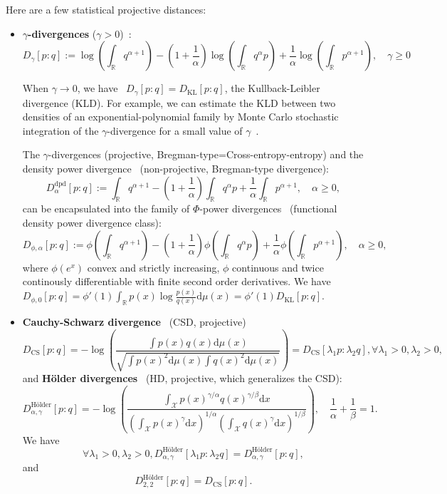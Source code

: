 \documentclass[11pt]{article}
\def\dmu{\mathrm{d}\mu}
\def\KL{\mathrm{KL}}
\def\CS{\mathrm{CS}}
\def\dmu{\mathrm{d}\mu}
\def\KL{\mathrm{KL}}
\begin{document}
Here are a few statistical projective distances:

\begin{itemize}
\item {\bf $\gamma$-divergences} ($\gamma>0$)~\cite{gammadivergence-2001,gammadivergence-2008}:
$$
D_{\gamma}[p:q]:=\log \left(\int_{\mathbb{R}} q^{\alpha+1}\right)-\left(1+\frac{1}{\alpha}\right) \log \left(\int_{\mathbb{R}} q^{\alpha} p\right)+\frac{1}{\alpha} \log \left(\int_{\mathbb{R}} p^{\alpha+1}\right),\quad \gamma\geq 0
$$

When $\gamma\rightarrow 0$, we have~\cite{gammadivergence-2008} $D_{\gamma}[p:q]=D_\KL[p:q]$, the Kullback-Leibler divergence (KLD).
For example, we can estimate the KLD between two densities of an exponential-polynomial family by Monte Carlo stochastic integration of the $\gamma$-divergence for a small value of $\gamma$~\cite{PMPEF-2016}.

The $\gamma$-divergences (projective, Bregman-type=Cross-entropy-entropy) and the density power divergence~\cite{BasuPowerDivergence-1998} (non-projective, Bregman-type divergence):
$$
D_{\alpha}^\mathrm{dpd}[p:q]:=\int_{\mathbb{R}} q^{\alpha+1}-\left(1+\frac{1}{\alpha}\right) \int_{\mathbb{R}} q^{\alpha} p+\frac{1}{\alpha} \int_{\mathbb{R}} p^{\alpha+1},\quad \alpha\geq 0,
$$
can be encapsulated into the family of $\Phi$-power divergences~\cite{PhiPowerDivergence-2021} (functional density power divergence class):
$$
D_{\phi, \alpha}[p:q]:=\phi\left(\int_{\mathbb{R}} q^{\alpha+1}\right)-\left(1+\frac{1}{\alpha}\right) \phi\left(\int_{\mathbb{R}} q^{\alpha} p\right)+\frac{1}{\alpha} \phi\left(\int_{\mathbb{R}} p^{\alpha+1}\right),\quad \alpha\geq 0,
$$
where $\phi(e^x)$ convex and strictly increasing, $\phi$ continuous and twice continously differentiable with finite second order derivatives.
We have $D_{\phi,0}[p:q]=\phi'(1)\int_{\mathbb{R}} p(x)\log\frac{p(x)}{q(x)}\dmu(x)=\phi'(1)D_\KL[p:q]$.

\item {\bf Cauchy-Schwarz divergence}~\cite{jenssen2006cauchy} (CSD, projective)
$$
D_\CS[p:q]=-\log \left( \frac{\int p(x) q(x) \dmu(x)}{\sqrt{\int p(x)^{2}  \dmu(x) \int q(x)^{2}  \dmu(x)}} \right) = D_\CS[\lambda_1 p:\lambda_2 q], \forall \lambda_1>0,\lambda_2>0,
$$
and {\bf H\"older divergences}~\cite{HolderDivergence-2017} (HD, projective, which generalizes the CSD):
$$
D_{\alpha, \gamma}^{\mbox{H\"older}}[p:q]=
-\log \left(\frac{\int_{\mathcal{X}} p(x)^{\gamma / \alpha} q(x)^{\gamma / \beta} \mathrm{d} x}{\left(\int_{\mathcal{X}} p(x)^{\gamma} \mathrm{d} x\right)^{1 / \alpha}\left(\int_{\mathcal{X}} q(x)^{\gamma} \mathrm{d} x\right)^{1 / \beta}}\right),\quad \frac{1}{\alpha}+\frac{1}{\beta}=1 .
$$
We have
$$
\forall \lambda_1>0, \lambda_2>0, D_{\alpha, \gamma}^{\mbox{H\"older}}[\lambda_1 p:\lambda_2 q]= D_{\alpha, \gamma}^{\mbox{H\"older}}[p:q],
$$
and
$$
D_{2,2}^{\mbox{H\"older}}[p:q]=D_\CS[p:q].
$$


\end{itemize}
\end{document}
